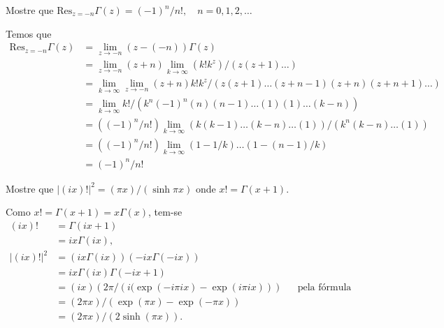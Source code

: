 \documentclass[a4paper,12pt, leqno, answers]{exam}
\begin{document}
\begin{questions}
    \question Mostre que $\mathrm{Res}_{z = -n} \Gamma(z) = \left( -1 \right)^n / n!, \quad n = 0, 1, 2, \ldots$
    \begin{solution}
        Temos que
        \begin{align*}
            \mathrm{Res}_{z = -n} \Gamma(z) &= \lim_{z \to - n} \left( z - (-n) \right) \Gamma(z) \\
            &= \lim_{z \to -n} \left( z + n \right) \lim_{k \to \infty} \left( k! k^z \right) / \left( z (z + 1) \ldots \right) \\
            &= \lim_{k \to \infty} \lim_{z \to -n} (z + n) k! k^z / \left( z (z + 1) \ldots (z + n - 1) (z + n) (z + n + 1) \ldots \right) \\
            &= \lim_{k \to \infty} k! / \left( k^n (-1)^n (n) (n - 1) \ldots (1) (1) \ldots (k - n) \right) \\
            &= \left( (-1)^n / n! \right) \lim_{k \to \infty} \left( k (k - 1) \ldots (k - n) \ldots (1) \right) / \left( k^n (k - n) \ldots (1) \right) \\
            &= \left( (-1)^n / n! \right) \lim_{k \to \infty} \left( 1 - 1 /k \right) \ldots \left( 1 - (n - 1) / k \right) \\
            &= (-1)^n / n!
        \end{align*}
    \end{solution}

    \question Mostre que $| \left( i x \right)! |^2 = \left( \pi x \right) / \left( \sinh \pi x \right)$ onde $x! = \Gamma(x + 1)$.
    \begin{solution}
        Como $x! = \Gamma(x + 1) = x \Gamma(x)$, tem-se
        \begin{align*}
            (i x)! &= \Gamma(ix + 1) \\
            &= ix \Gamma(i x), \\
            | (i x)! |^2 &= \left( i x \Gamma(i x) \right) \left( -i x \Gamma(-i x) \right) \\
            &= i x \Gamma(i x) \Gamma(-i x + 1) \\
            &= (i x) \left( 2 \pi / \left( i ( \exp(-i \pi i x) - \exp(i \pi i x) \right) \right) && \text{pela f\'{o}rmula de reflex\~{a}o} \\
            &=\left( 2 \pi x \right) / \left( \exp(\pi x) - \exp(-\pi x) \right) \\
            &= \left( 2 \pi x \right) / \left( 2 \sinh(\pi x) \right).
        \end{align*}


\end{solution}
\end{questions}
\end{document}
